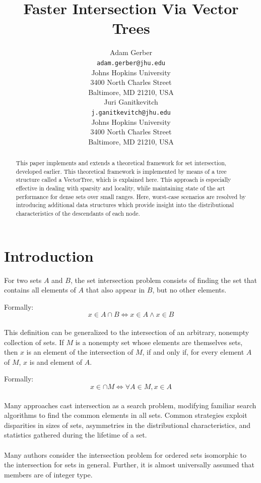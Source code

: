 \documentclass[11pt,letterpaper]{article}
\title{Faster Intersection Via Vector Trees}
\author{
	Adam Gerber \\
	{\tt adam.gerber@jhu.edu}\\
	Johns Hopkins University\\
	3400 North Charles Street \\
	Baltimore, MD 21210, USA\\
	\And 
	{Juri Ganitkevitch} \\
	{\tt j.ganitkevitch@jhu.edu}\\
	Johns Hopkins University\\
	3400 North Charles Street \\
	Baltimore, MD 21210, USA
}
\begin{document}
\maketitle

\begin{abstract}
This paper implements and extends a theoretical framework
for set intersection, developed earlier.  This theoretical framework is
implemented by means of a tree structure called a VectorTree, which
is explained here.  This approach is especially effective
in dealing with sparsity and locality, while maintaining
state of the art performance for dense sets over small ranges.
Here, worst-case scenarios are resolved by introducing
additional data structures which provide insight into the
distributional characteristics of the descendants of each node.
\end{abstract}


\section{Introduction}
For two sets $A$ and $B$, the set intersection problem consists of
finding the set that contains all elements of $A$ that also appear in $B$,
but no other elements. 

Formally: 
\[x \in A \cap B \iff x \in A \land x \in B\]

\paragraph{}
This definition can be generalized to the intersection of an arbitrary,
nonempty collection of sets. If $M$ is a nonempty set whose elements
are themselves sets, then $x$ is an element of the intersection of $M$,
 if and only if, for every element $A$ of $M$, $x$ is and element of $A$.

Formally:
\[ x \in \cap M \iff \forall A \in M, x \in A\]

\paragraph{}
Many approaches cast intersection as a search problem, modifying familiar
search algorithms to find the common elements in all sets.  Common strategies
exploit disparities in sizes of sets, asymmetries in the distributional characteristics,
and statistics gathered during the lifetime of a set.

\paragraph{}
Many authors consider the intersection problem for ordered sets isomorphic
to the intersection for sets in general.  Further, it is almost universally assumed
that members are of integer type.
\end{document}
